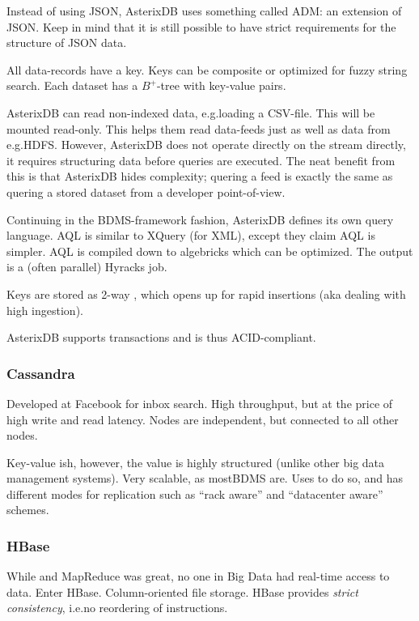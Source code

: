 Instead of using JSON, AsterixDB uses something called ADM: an
extension of JSON. Keep in mind that it is still possible to have strict
requirements for the structure of JSON data. 

All data-records have a key. Keys can be composite or optimized for fuzzy string search.
Each dataset has a $B^{+}$-tree with key-value pairs.

AsterixDB can read non-indexed data, e.g.\@ loading a CSV-file. This will be mounted read-only.
This helps them read data-feeds just as well as data from e.g.\@ HDFS. However, AsterixDB does not operate
directly on the stream directly, it requires structuring data before queries are executed.
The neat benefit from this is that AsterixDB hides complexity; quering a feed is exactly
the same as quering a stored dataset from a developer point-of-view.

Continuing in the BDMS-framework fashion, AsterixDB defines its own query language.
AQL is similar to XQuery (for XML), except they claim AQL is simpler. AQL is compiled down to algebricks
which can be optimized. The output is a (often parallel) Hyracks job.

Keys are stored as 2-way , which opens up for rapid insertions 
(aka dealing with high ingestion).

AsterixDB supports transactions and is thus ACID-compliant.



\subsubsection{Cassandra}\label{sec:cassandra}
Developed at Facebook for inbox search.
High throughput, but at the price of high write and read latency.
Nodes are independent, but connected to all other nodes.

Key-value ish, however, the value is highly structured (unlike other big data
management systems).  Very scalable, as mostBDMS are.
Uses  to do so, and has different modes for replication
such as ``rack aware'' and ``datacenter aware'' schemes.

\subsubsection{HBase}\label{sec:HBase}
While  and MapReduce was great, no one in Big Data
had real-time access to data. Enter HBase. Column-oriented file storage.
HBase provides \textit{strict consistency}, i.e.\@ no reordering of instructions.

